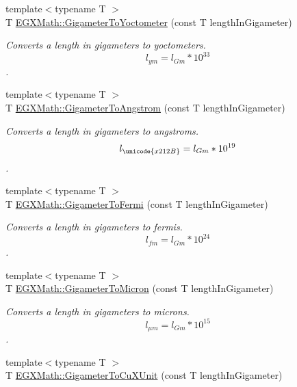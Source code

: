 \begin{DoxyCompactItemize}
{\footnotesize template$<$typename T $>$ }\\T \mbox{\hyperlink{group___e_g_x_math-_conversions-_length_conversions-_s_i-_gigameter-_s_i_ga2eff69e0a00032c24617fde4ac30bd49}{E\+G\+X\+Math\+::\+Gigameter\+To\+Yoctometer}} (const T length\+In\+Gigameter)
\begin{DoxyCompactList}\small\item\em Converts a length in gigameters to yoctometers. \[ l_{ym}=l_{Gm} * 10^{33} \]. \end{DoxyCompactList}\item 
{\footnotesize template$<$typename T $>$ }\\T \mbox{\hyperlink{group___e_g_x_math-_conversions-_length_conversions-_s_i-_gigameter-_non-_s_i_ga622e85e3f663039f3802b29d25655989}{E\+G\+X\+Math\+::\+Gigameter\+To\+Angstrom}} (const T length\+In\+Gigameter)
\begin{DoxyCompactList}\small\item\em Converts a length in gigameters to angstroms. \[ l_{\unicode{x212B}}=l_{Gm} * 10^{19} \]. \end{DoxyCompactList}\item 
{\footnotesize template$<$typename T $>$ }\\T \mbox{\hyperlink{group___e_g_x_math-_conversions-_length_conversions-_s_i-_gigameter-_non-_s_i_gadf6d730ad6e47bc8be214f3ef59b48ca}{E\+G\+X\+Math\+::\+Gigameter\+To\+Fermi}} (const T length\+In\+Gigameter)
\begin{DoxyCompactList}\small\item\em Converts a length in gigameters to fermis. \[ l_{fm}=l_{Gm} * 10^{24} \]. \end{DoxyCompactList}\item 
{\footnotesize template$<$typename T $>$ }\\T \mbox{\hyperlink{group___e_g_x_math-_conversions-_length_conversions-_s_i-_gigameter-_non-_s_i_ga90426d22455e96b1f61e1850c7b89f77}{E\+G\+X\+Math\+::\+Gigameter\+To\+Micron}} (const T length\+In\+Gigameter)
\begin{DoxyCompactList}\small\item\em Converts a length in gigameters to microns. \[ l_{\mu m}=l_{Gm} * 10^{15} \]. \end{DoxyCompactList}\item 
{\footnotesize template$<$typename T $>$ }\\T \mbox{\hyperlink{group___e_g_x_math-_conversions-_length_conversions-_s_i-_gigameter-_non-_s_i_gab542297b31676ef5b3cf62f0c63a6f20}{E\+G\+X\+Math\+::\+Gigameter\+To\+Cu\+X\+Unit}} (const T length\+In\+Gigameter)

\end{DoxyCompactItemize}

